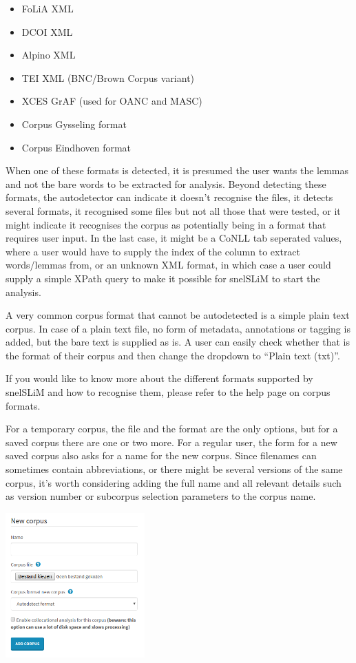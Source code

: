 \documentclass[11pt,a4paper]{article}
\begin{document}
\begin{itemize}
    \item FoLiA XML
    \item DCOI XML
    \item Alpino XML
    \item TEI XML (BNC/Brown Corpus variant)
    \item XCES GrAF (used for OANC and MASC)
    \item Corpus Gysseling format
    \item Corpus Eindhoven format
\end{itemize}

When one of these formats is detected, it is presumed the user wants the lemmas and not the bare words to be extracted for analysis. Beyond detecting these formats, the autodetector can indicate it doesn't recognise the files, it detects several formats, it recognised some files but not all those that were tested, or it might indicate it recognises the corpus as potentially being in a format that requires user input. In the last case, it might be a CoNLL tab seperated values, where a user would have to supply the index of the column to extract words/lemmas from, or an unknown XML format, in which case a user could supply a simple XPath query to make it possible for snelSLiM to start the analysis.

A very common corpus format that cannot be autodetected is a simple plain text corpus. In case of a plain text file, no form of metadata, annotations or tagging is added, but the bare text is supplied as is. A user can easily check whether that is the format of their corpus and then change the dropdown to ``Plain text (txt)''. 

If you would like to know more about the different formats supported by snelSLiM and how to recognise them, please refer to the help page on corpus formats.

For a temporary corpus, the file and the format are the only options, but for a saved corpus there are one or two more. For a regular user, the form for a new saved corpus also asks for a name for the new corpus. Since filenames can sometimes contain abbreviations, or there might be several versions of the same corpus, it's worth considering adding the full name and all relevant details such as version number or subcorpus selection parameters to the corpus name.

\centerline{\includegraphics[width=0.4\textwidth]{images/uploadmycorpora.png}}
\end{document}
